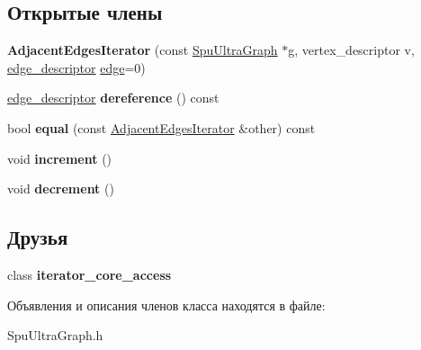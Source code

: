 \subsection*{Открытые члены}
\begin{DoxyCompactItemize}
\item 
\mbox{\label{class_s_p_u___g_r_a_p_h_1_1_spu_ultra_graph_1_1_adjacent_edges_iterator_a64417e40bc04bd78e60c67411e7a5ce8}} 
{\bfseries Adjacent\+Edges\+Iterator} (const \hyperlink{class_s_p_u___g_r_a_p_h_1_1_spu_ultra_graph}{Spu\+Ultra\+Graph} $\ast$g, vertex\+\_\+descriptor v, \hyperlink{class_s_p_u___g_r_a_p_h_1_1_spu_ultra_graph_a5f3776e003ef0a1648f1d9f84289810b}{edge\+\_\+descriptor} \hyperlink{class_s_p_u___g_r_a_p_h_1_1_spu_ultra_graph_a51468aa2278d3abb0c338ffbeac7747a}{edge}=0)
\item 
\mbox{\label{class_s_p_u___g_r_a_p_h_1_1_spu_ultra_graph_1_1_adjacent_edges_iterator_a656e4ee28307ec462bc32500a0d81ff7}} 
\hyperlink{class_s_p_u___g_r_a_p_h_1_1_spu_ultra_graph_a5f3776e003ef0a1648f1d9f84289810b}{edge\+\_\+descriptor} {\bfseries dereference} () const
\item 
\mbox{\label{class_s_p_u___g_r_a_p_h_1_1_spu_ultra_graph_1_1_adjacent_edges_iterator_a28ed894caf491d7a9b66e97b9724ee2b}} 
bool {\bfseries equal} (const \hyperlink{class_s_p_u___g_r_a_p_h_1_1_spu_ultra_graph_1_1_adjacent_edges_iterator}{Adjacent\+Edges\+Iterator} \&other) const
\item 
\mbox{\label{class_s_p_u___g_r_a_p_h_1_1_spu_ultra_graph_1_1_adjacent_edges_iterator_ace201686851d7e5c4353afeddcd9c24d}} 
void {\bfseries increment} ()
\item 
\mbox{\label{class_s_p_u___g_r_a_p_h_1_1_spu_ultra_graph_1_1_adjacent_edges_iterator_ac96c7bfab4c3d631ca7499961bbc87a1}} 
void {\bfseries decrement} ()
\end{DoxyCompactItemize}
\subsection*{Друзья}
\begin{DoxyCompactItemize}
\item 
\mbox{\label{class_s_p_u___g_r_a_p_h_1_1_spu_ultra_graph_1_1_adjacent_edges_iterator_a0975271623c74c5b89bdf8d7fbce69c4}} 
class {\bfseries iterator\+\_\+core\+\_\+access}
\end{DoxyCompactItemize}


Объявления и описания членов класса находятся в файле\+:\begin{DoxyCompactItemize}
\item 
Spu\+Ultra\+Graph.\+h\end{DoxyCompactItemize}
